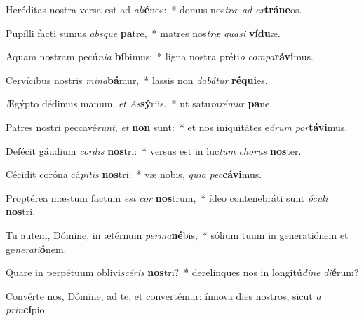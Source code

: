 \item Heréditas nostra versa est ad \textit{a}\textit{li}\textbf{é}nos:~* domus nos\textit{træ} \textit{ad} \textit{ex}\textbf{trá}\textbf{ne}os.
\item Pupílli facti sumus \textit{abs}\textit{que} \textbf{pa}tre,~* matres nos\textit{træ} \textit{qua}\textit{si} \textbf{ví}\textbf{du}æ.
\item Aquam nostram pecú\textit{ni}\textit{a} \textbf{bí}bimus:~* ligna nostra préti\textit{o} \textit{com}\textit{pa}\textbf{rá}\textbf{vi}mus.
\item Cervícibus nostris \textit{mi}\textit{na}\textbf{bá}mur,~* lassis non \textit{da}\textit{bá}\textit{tur} \textbf{ré}\textbf{qui}es.
\item Ægýpto dédimus manum, \textit{et} \textit{As}\textbf{sý}riis,~* ut satu\textit{ra}\textit{ré}\textit{mur} \textbf{pa}ne.
\item Patres nostri peccavé\textit{runt}, \textit{et} \textbf{non} sunt:~* et nos iniquitátes e\textit{ó}\textit{rum} \textit{por}\textbf{tá}\textbf{vi}mus.
\item Defécit gáudium \textit{cor}\textit{dis} \textbf{nos}tri:~* versus est in luc\textit{tum} \textit{cho}\textit{rus} \textbf{nos}ter.
\item Cécidit coróna cá\textit{pi}\textit{tis} \textbf{nos}tri:~* væ nobis, \textit{qui}\textit{a} \textit{pec}\textbf{cá}\textbf{vi}mus.
\item Proptérea mæstum factum \textit{est} \textit{cor} \textbf{nos}trum,~* ídeo contenebráti sunt \textit{ó}\textit{cu}\textit{li} \textbf{nos}tri.
\item Tu autem, Dómine, in ætérnum \textit{per}\textit{ma}\textbf{né}bis,~* sólium tuum in generatiónem et ge\textit{ne}\textit{ra}\textit{ti}\textbf{ó}nem.
\item Quare in perpétuum oblivi\textit{scé}\textit{ris} \textbf{nos}tri?~* derelínques nos in longitú\textit{di}\textit{ne} \textit{di}\textbf{é}rum?
\item Convérte nos, Dómine, ad te, et convertémur: ínnova dies nostros, sicut \textit{a} \textit{prin}\textbf{cí}pio.
